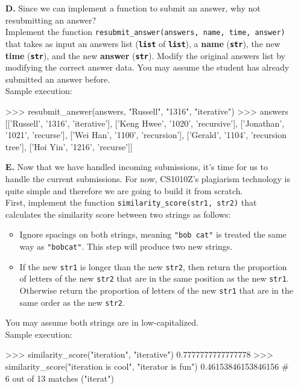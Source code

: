\begin{enumerate}
\item[\textbf{D.}]
Since we can implement a function to submit an answer, why not resubmitting an answer? \\
Implement the function \colorbox{CornflowerBlue!20}{\texttt{resubmit\_answer(answers, name, time, answer)}} 
that takes as input an answers list (\colorbox{CornflowerBlue!20}{\texttt{\textbf{list}}} of \colorbox{CornflowerBlue!20}{\texttt{\textbf{list}}}), a \textbf{name} 
(\colorbox{CornflowerBlue!20}{\texttt{\textbf{str}}}), the new \textbf{time} (\colorbox{CornflowerBlue!20}{\texttt{\textbf{str}}}), and the new \textbf{answer} 
(\colorbox{CornflowerBlue!20}{\texttt{\textbf{str}}}). Modify the original answers list by modifying the correct answer data. You may assume the student has already 
submitted an answer before. \\
Sample execution:
\begin{python}
>>> resubmit_answer(answers, "Russell", "1316", "iterative")
>>> answers
[['Russell', '1316', 'iterative'], ['Keng Hwee', '1020', 'recursive'],
 ['Jonathan', '1021', 'recurse'], ['Wei Han', '1100', 'recursion'],
 ['Gerald', '1104', 'recursion tree'], ['Hoi Yin', '1216', 'recurse']]
\end{python}
\begin{flushright}
    [4 marks]
\end{flushright}

\item[\textbf{E.}]
Now that we have handled incoming submissions, it's time for us to handle the current submissions. For now, CS1010Z's plagiarism technology is quite simple and 
therefore we are going to build it from scratch. \\
First, implement the function \colorbox{CornflowerBlue!20}{\texttt{similarity\_score(str1, str2)}} that calculates the similarity score 
between two strings as follows:
\begin{itemize}
\item Ignore spacings on both strings, meaning \texttt{"bob cat"} is treated the same way as \texttt{"bobcat"}. This step will produce two new strings.
\item If the new \colorbox{CornflowerBlue!20}{\texttt{str1}} is longer than the new \colorbox{CornflowerBlue!20}{\texttt{str2}}, then return the proportion of letters of the new 
\colorbox{CornflowerBlue!20}{\texttt{str2}} that are in the same position as the new \colorbox{CornflowerBlue!20}{\texttt{str1}}. Otherwise return the proportion of letters of the new 
\colorbox{CornflowerBlue!20}{\texttt{str1}} that are in the same order as the new \colorbox{CornflowerBlue!20}{\texttt{str2}}.
\end{itemize}
You may assume both strings are in low-capitalized. \\
Sample execution:
\begin{python}
>>> similarity_score("iteration", "iterative")
0.7777777777777778
>>> similarity_score("iteration is cool", "iterator is fun")
0.46153846153846156 # 6 out of 13 matches ("iterat")
\end{python}
\begin{flushright}
    [6 marks]
\end{flushright}


\end{enumerate}
